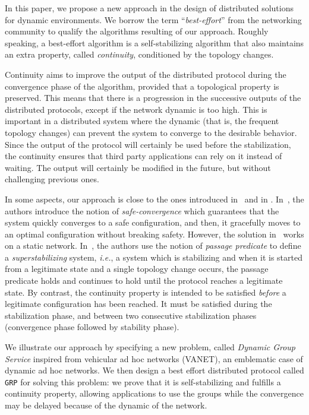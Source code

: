 \documentclass[11pt,english]{article}
\newcommand{\Latin}[1]{\textit{#1}}
\newcommand{\ie}{\Latin{i.e.},\xspace}
\begin{document}
In this paper, we propose a new approach in the design of distributed solutions
for dynamic environments.  
We borrow the term ``{\em best-effort}'' from the networking community to qualify
the algorithms resulting of our approach. 
Roughly speaking, a best-effort algorithm is a self-stabilizing algorithm 
that also maintains an extra property, called {\em continuity}, 
conditioned by the topology changes.  

Continuity aims to improve the output of the distributed protocol during the
convergence phase of the algorithm, provided that a topological property is
preserved.
This means that there is a progression in the successive outputs of the
distributed protocols, except if the network dynamic is too high. This is
important in a distributed system where the
dynamic (that is, the frequent topology changes) can prevent the system to 
converge to the desirable behavior.
Since the output of the protocol will certainly be used before the
stabilization, the continuity ensures that third party applications can rely on
it instead of waiting. The output will certainly be modified in the future, but
without challenging previous ones.

In some aspects, our approach is close to the ones introduced in~\cite{KM06c}
and in \cite{PODC95}.  In~\cite{KM06c}, the authors introduce the notion of
\emph{safe-convergence} which guarantees that the system quickly converges to a
safe configuration, and then, it gracefully moves to an optimal configuration
without breaking safety.  However, the solution in~\cite{KM06c} works on a
static network.  In~\cite{PODC95}, the authors use the notion of \emph{passage
  predicate} to define a {\em superstabilizing} system, \ie a system which is
stabilizing and when it is started from a legitimate state and a single topology
change occurs, the passage predicate holds and continues to hold until the
protocol reaches a legitimate state.
By contrast, the continuity property is intended to be satisfied {\em before} a legitimate
configuration has been reached. It must be satisfied during the stabilization
phase, and between two consecutive stabilization phases (convergence phase
followed by stability phase). 

We illustrate our approach by specifying a new problem, called \emph{Dynamic
  Group Service} inspired from vehicular ad hoc networks (VANET), an emblematic
case of dynamic ad hoc networks. We then design a best effort distributed
protocol called \texttt{GRP} for solving this problem: we prove that it is
self-stabilizing and fulfills a continuity property, allowing applications to
use the groups while the convergence may be delayed because of the dynamic of
the network.
\end{document}
